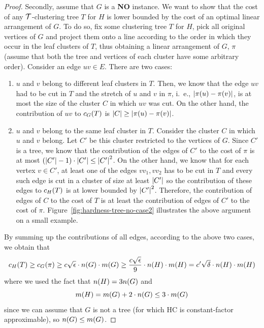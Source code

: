 \begin{proof}
    Secondly, assume that $G$ is a \textbf{NO} instance. We want to show that the cost of any $\mathcal{T}$-clustering tree $T$ for $H$ is lower bounded by the cost of an optimal linear arrangement of $G$. To do so, fix some clustering tree $T$ for $H$, pick all original vertices of $G$ and project them onto a line according to the order in which they occur in the leaf clusters of $T$, thus obtaining a linear arrangement of $G$, $\pi$ (assume that both the tree and vertices of each cluster have some arbitrary order). Consider an edge $uv \in E$. There are two cases:
    \begin{enumerate}
    \item $u$ and $v$ belong to different leaf clusters in $T$. Then, we know that the edge $uv$ had to be cut in $T$ and the stretch of $u$ and $v$ in $\pi$, i.~e., $\mathopen{}\left| \pi\mathopen{}\left( u \right)-\pi\mathopen{}\left( v \right) \right|$, is at most the size of the cluster $C$ in which $uv$ was cut. On the other hand, the contribution of $uv$ to $c_G\mathopen{}\left( T \right)$ is $\mathopen{}\left| C \right|\geq \mathopen{}\left| \pi\mathopen{}\left( u \right)-\pi\mathopen{}\left( v \right) \right|$.
    \item $u$ and $v$ belong to the same leaf cluster in $T$. Consider the cluster $C$ in which $u$ and $v$ belong. Let $C'$ be this cluster restricted to the vertices of $G$. Since $C'$ is a tree, we know that the contribution of the edges of $C'$ to the cost of $\pi$ is at most $\mathopen{}\left( \mathopen{}\left| C' \right|-1 \right)\cdot \mathopen{}\left| C' \right|\leq \mathopen{}\left| C' \right|^2$. On the other hand, we know that for each vertex $v\in C'$, at least one of the edges $vv_1, vv_2$ has to be cut in $T$ and every such edge is cut in a cluster of size at least $\mathopen{}\left| C' \right|$ so the contribution of these edges to $c_H\mathopen{}\left( T \right)$ is at lower bounded by $\mathopen{}\left| C' \right|^2$. Therefore, the contribution of edges of $C$ to the cost of $T$ is at least the contribution of edges of $C'$ to the cost of $\pi$. Figure~\ref{fig:hardness-tree-no-case2} illustrates the above argument on a small example.
    \end{enumerate}   

    
    
    By summing up the contributions of all edges, according to the above two cases, we obtain that 
    \[
    {c}_H\mathopen{}\left( T \right)\geq {c}_G\mathopen{}\left( \pi \right)\geq c\sqrt{\epsilon} \cdot n\mathopen{}\left( G \right) \cdot m\mathopen{}\left( G \right) \geq \frac{c\sqrt{\epsilon}}{9}\cdot n\mathopen{}\left( H \right) \cdot m\mathopen{}\left( H \right) = c'\sqrt{\delta} \cdot n\mathopen{}\left( H \right) \cdot m\mathopen{}\left( H \right)
    \]
    where we used the fact that $n\mathopen{}\left( H \right)=3n\mathopen{}\left( G \right)$ and 
    \[
    m\mathopen{}\left( H \right)= m\mathopen{}\left( G \right)+2\cdot n\mathopen{}\left( G \right)\leq 3\cdot m\mathopen{}\left( G \right)
    \]
    since we can assume that $G$ is not a tree (for which \textsc{HC} is constant-factor approximable), so $n\mathopen{}\left( G \right)\leq m\mathopen{}\left( G \right)$.
\end{proof}

